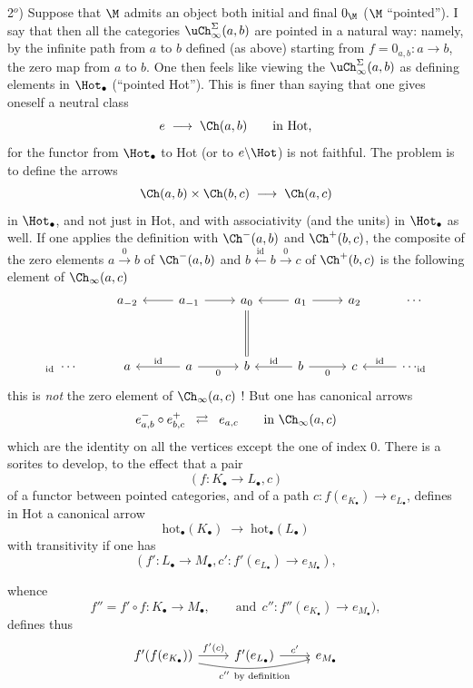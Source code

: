2$^o$) Suppose that $\M$ admits an object both initial and final $0_{\M}$ ($\M$ ``pointed''). I say that then all the categories $\uCh^{\Sigma}_{\infty}(a,b)$ are pointed in a natural way: namely, by the infinite path from $a$ to $b$ defined (as above) starting from $f = 0_{a,b} : a \longrightarrow b$, the zero map from $a$ to $b$. One then feels like viewing the $\uCh^{\Sigma}_{\infty}(a,b)$ as defining elements in $\Hot_{\bullet}$ (``pointed Hot''). This is finer than saying that one gives oneself a neutral class
\[
e \;\longrightarrow\; \Ch(a,b) \qquad \text{in Hot,}
\]
for the functor from $\Hot_{\bullet}$ to Hot (or to $e\backslash\Hot$) is not faithful. The problem is to define the arrows
\[
\Ch(a,b)\times\Ch(b,c) \;\longrightarrow\; \Ch(a,c)
\]
in $\Hot_{\bullet}$, and not just in Hot, and with associativity (and the units) in $\Hot_{\bullet}$ as well. If one applies the definition with $\Ch^{-}(a,b)$ and $\Ch^{+}(b,c)$, the composite of the zero elements $a \xrightarrow{\ 0\ } b$ of $\Ch^{-}(a,b)$ and $b \xleftarrow{\ \mathrm{id}\ } b \xrightarrow{\ 0\ } c$ of $\Ch^{+}(b,c)$
is the following element of $\Ch_{\infty}(a,c)$
\[
\begin{tikzcd}[row sep=huge]
 & a_{-2} & a_{-1} \arrow[l] \arrow[r] & a_{0} \arrow[d, equal] & a_{1} \arrow[l] \arrow[r] & a_{2} & \cdots \\
{}_{\mathrm{id}}\ \cdots & a & a \arrow[l, "\mathrm{id}"'] \arrow[r, "0"'] & b & b \arrow[l, "\mathrm{id}"'] \arrow[r, "0"'] & c & \cdots_{\mathrm{id}} \arrow[l, "\mathrm{id}"']
\end{tikzcd}
\]
this is \textit{not} the zero element of $\Ch_{\infty}(a,c)$ ! But one has canonical arrows
\[
e^{-}_{a,b}\circ e^{+}_{b,c} \;\;\rightleftarrows\;\; e_{a,c} \qquad \text{in } \Ch_{\infty}(a,c)
\]
which are the identity on all the vertices except the one of index 0. There is a sorites to develop, to the effect that a pair
\[
(f : K_{\bullet} \longrightarrow L_{\bullet}, c)
\]
of a functor between pointed categories, and of a path $c : f(e_{K_{\bullet}}) \longrightarrow e_{L_{\bullet}}$, defines in Hot a canonical arrow
\[
\mathrm{hot}_{\bullet}(K_{\bullet}) \;\longrightarrow\; \mathrm{hot}_{\bullet}(L_{\bullet})
\]
with transitivity if one has
\[
(f' : L_{\bullet} \longrightarrow M_{\bullet}, c' : f'(e_{L_{\bullet}}) \longrightarrow e_{M_{\bullet}}),
\]


whence
\[
f'' = f'\circ f : K_{\bullet} \longrightarrow M_{\bullet}, \qquad \text{and}\ \ c'' : f''(e_{K_{\bullet}}) \longrightarrow e_{M_{\bullet}}), %
\]
defines thus
\[
\begin{tikzcd}
f'(f(e_{K_{\bullet}})) \arrow[r, "f'(c)"] \arrow[rr, bend right=12, "{c''\ \text{by definition}}"'] & f'(e_{L_{\bullet}}) \arrow[r, "c'"] & e_{M_{\bullet}}
\end{tikzcd}
\]

